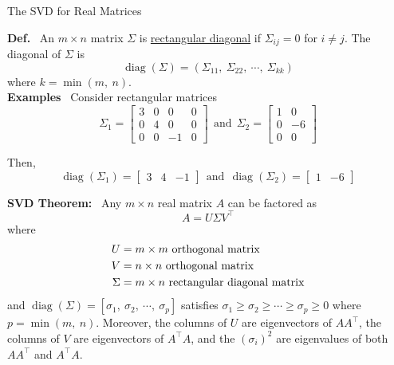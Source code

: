 \documentclass[letterpaper]{article}
\begin{document}
\newpage

\begin{center}

The SVD for Real Matrices
\end{center}

\noindent \textbf{Def.}~ An $m\times n$ matrix $\Sigma$ is \underline{rectangular diagonal} if $\Sigma_{ij}=0$ for $i\neq j$.  The diagonal of $\Sigma$ is
    \begin{equation*}
        \operatorname{diag}\left(\Sigma\right)=\left(\Sigma_{11},\ \Sigma_{22},\ \cdots,\ \Sigma_{kk}\right)
    \end{equation*}
    where $k=\operatorname{min}(m,\ n)$.\\

\noindent \textbf{Examples}~ Consider rectangular matrices
$$
        \Sigma_1 = \left[ \begin{array}{rrrr}
            3 & 0 & 0 & 0\\
            0 & 4 & 0 & 0\\
            0 & 0 & -1 & 0
        \end{array}\right] ~~\text{and}~~
        \Sigma_2 =  \left[ \begin{array}{rr}
            1 & 0\\
            0 & -6\\
            0 & 0
        \end{array}\right]
$$

    Then,
$$
        \operatorname{diag}\left(\Sigma_1\right) = \begin{bmatrix} 3 & 4 & -1 \end{bmatrix}~~\text{and}~~
        \operatorname{diag}\left(\Sigma_2\right) = \begin{bmatrix} 1 & -6 \end{bmatrix}
$$

\noindent \textbf{SVD Theorem:}~ Any $m\times n$ real matrix $A$ can be factored as
    \begin{equation*}
        A=U\Sigma V^\top
    \end{equation*}
    where
    \begin{align*}
        U &= m\times m\textnormal{ orthogonal matrix}\\
        V &= n\times n\textnormal{ orthogonal matrix}\\
        \Sigma &= m\times n\textnormal{ rectangular diagonal matrix}
    \end{align*}
  and  $\operatorname{diag}(\Sigma)=[\sigma_1,\ \sigma_2,\ \cdots,\ \sigma_p]$ satisfies $\sigma_1\geq\sigma_2\geq\cdots\geq\sigma_p\geq0$ where $p=\operatorname{min}(m,\ n)$. Moreover, the columns of $U$ are eigenvectors of $A A^\top$, the columns of $V$ are eigenvectors of $A^\top A$, and the $(\sigma_i)^2$ are eigenvalues of both $AA^\top$ and $A^\top  A$.
\end{document}
